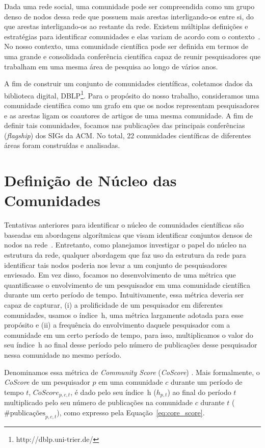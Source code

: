 \documentclass[12pt]{article}
\begin{document}
Dada uma rede social, uma comunidade pode ser compreendida como um grupo denso de nodos dessa rede que possuem mais arestas 
interligando-os entre si, do que arestas interligando-os ao restante da rede. Existem múltiplas definições e estratégias 
para identificar comunidades e elas variam de acordo com o contexto~\cite{Kleinberg2008,Leskovec2010}. No nosso contexto, 
uma comunidade científica pode ser definida em termos de uma grande e consolidada conferência científica capaz de reunir 
pesquisadores que trabalham em uma mesma área de pesquisa ao longo de vários anos.

A fim de construir um conjunto de comunidades científicas, coletamos dados da biblioteca digital, DBLP\footnote{http://dblp.uni-trier.de/}.
Para o propósito do nosso 
trabalho, consideramos uma comunidade científica como um grafo em que os nodos 
representam pesquisadores e as arestas ligam os coautores de artigos de uma mesma comunidade. A fim de definir tais 
comunidades, focamos nas publicações das principais conferências (\textit{flagship}) dos SIGs 
da ACM. No total, 22 comunidades científicas de diferentes áreas foram construídas e analisadas.

\section{Definição de Núcleo das Comunidades}

Tentativas anteriores para identificar o núcleo de comunidades científicas são baseadas em abordagens 
algorítmicas que visam identificar conjuntos densos de nodos na rede~\cite{Seifi2012}. Entretanto, 
como planejamos investigar o papel do núcleo na estrutura da rede, qualquer abordagem que faz uso da 
estrutura da rede para identificar tais nodos poderia nos levar a um conjunto de pesquisadores 
enviesado. Em vez disso, focamos no desenvolvimento de uma métrica que quantificasse o envolvimento 
de um pesquisador em uma comunidade científica durante um certo período de tempo. Intuitivamente, 
essa métrica deveria ser capaz de capturar,  (i) a prolificidade de um pesquisador em diferentes 
comunidades, usamos o índice~h, uma métrica largamente adotada para esse propósito e 
(ii) a frequência do envolvimento daquele pesquisador com a comunidade em um certo 
período de tempo, para isso, multiplicamos o valor do seu índice~h 
ao final desse período pelo número de publicações desse pesquisador nessa comunidade 
no mesmo período.

Denominamos essa métrica de \textit{Community Score} (\textit{CoScore}) \cite{Alves2013}. 
Mais formalmente, o \textit{CoScore} de um pesquisador $p$ em uma 
comunidade $c$ durante um período de tempo $t$, $\textit{CoScore}_{p,c,t}$, é dado 
pelo seu índice~h ($h_{p,t}$) ao final do período $t$ multiplicado pelo 
seu número de publicações na comunidade $c$ durante $t$ ($\textrm{\#}\text{publicações}_{p,c,t}$),
como expresso pela Equação~\ref{eq:core_score}.
\end{document}
